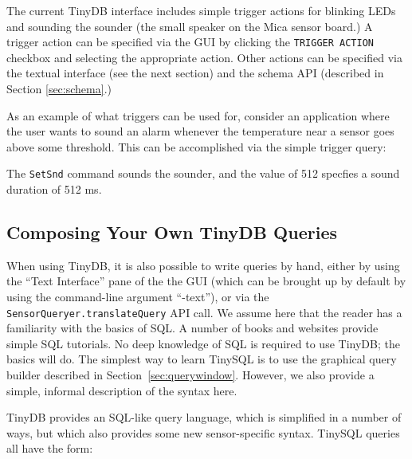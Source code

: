 \documentclass[11pt]{article}
\begin{document}
The current TinyDB interface includes simple trigger actions for blinking LEDs and
sounding the sounder  (the small speaker on the Mica sensor board.)  A trigger
action can be specified via the GUI by clicking the {\tt TRIGGER ACTION} checkbox and selecting the appropriate
action.  Other actions can be specified via the textual interface (see the next section) and the schema
API (described in Section \ref{sec:schema}.)  

As an example of what triggers can be used for, consider an application where the user wants to sound
an alarm whenever the temperature near a sensor goes above some threshold.  This can be accomplished
via the simple trigger query:


\noindent The {\tt SetSnd} command sounds the sounder, and the value of 512 specfies a sound duration of
512 ms.



\subsection{Composing Your Own TinyDB Queries}
\label{sec:tinydbsqlsyntax}
When using TinyDB, it is also possible to write queries by
hand, either by using the ``Text Interface'' pane of the the GUI
(which can be brought up by default by using the command-line  argument ``-text''), 
or via the {\tt SensorQueryer.translateQuery} API call.  We assume here that
the reader has a familiarity with the basics of SQL.  A number of
books and websites provide simple SQL tutorials.  No deep knowledge of
SQL is required to use TinyDB; the basics will do.  The simplest way
to learn TinySQL is to use the graphical query
builder described in Section~\ref{sec:querywindow}.  However, we also
provide a simple, informal description of the syntax here.

TinyDB provides an SQL-like query language, which is simplified in a
number of ways, but which also provides some new sensor-specific syntax.
TinySQL queries all have the form:
\end{document}
